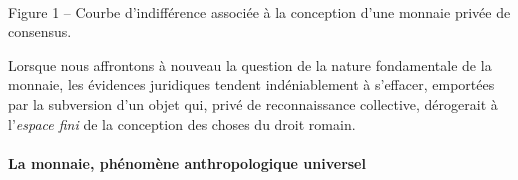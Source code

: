 {\pgfplotsset{compat=newest}
\hspace{1cm}
\begin{center}
\\Figure 1 \---{} Courbe d'indifférence associée à la conception d'une monnaie privée de consensus.
\end{center}

Lorsque nous affrontons à nouveau la question de la nature fondamentale de la monnaie, les évidences juridiques tendent indéniablement à s'effacer, emportées par la subversion d'un objet qui, privé de reconnaissance collective, dérogerait à l'\emph{espace fini} de la conception des choses du droit romain.\par
 
\paragraph{La monnaie, phénomène anthropologique universel}

}
